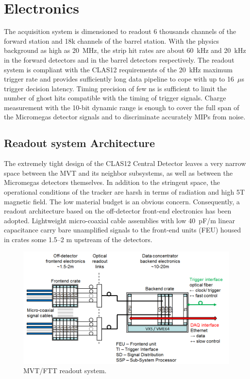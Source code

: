 \section{Electronics}

The acquisition system is dimensioned to readout 6 thousands channels of the forward station and 18k channels of the barrel station. With the physics background as high as 20~MHz, the strip hit rates are about 60~kHz and 20~kHz in the forward detectors and in the barrel detectors respectively. The readout system is compliant with the CLAS12 requirements of the 20~kHz maximum trigger rate and provides sufficiently long data pipeline to cope with up to 16~$\mu$s trigger decision latency. Timing precision of few ns is sufficient to limit the number of ghost hits compatible with the timing of trigger signals. Charge measurement with the 10-bit dynamic range is enough to cover the full span of the Micromegas detector signals and to discriminate accurately MIPs from noise.

\subsection{Readout system Architecture}
The extremely tight design of the CLAS12 Central Detector leaves a very narrow space between the MVT and its neighbor subsystems, as well as between the Micromegas detectors themselves.  In addition to the stringent space, the operational conditions of the tracker are harsh in terms of radiation and high 5T magnetic field. The low material budget is an obvious concern. Consequently, a readout architecture based on the off-detector front-end electronics has been adopted. Lightweight micro-coaxial cable assemblies with low 40~pF/m linear capacitance carry bare unamplified signals to the front-end units (FEU) housed in crates some 1.5--2 m upstream of the detectors. 

\begin{figure}[htb]
 \includegraphics[width=1.0\columnwidth,keepaspectratio]{images/electronics_fig1.png}
 \caption{MVT/FTT readout system.}
 \label{fig:mm-e_1}
\end{figure}

